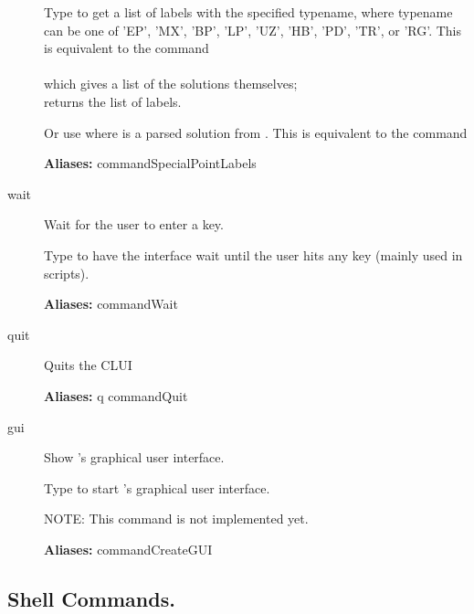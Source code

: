 \documentclass[12pt]{report}
\begin{document}
\begin{description}
    Type  to get a list of labels with the specified
    typename, where typename can be one of
    'EP', 'MX', 'BP', 'LP', 'UZ', 'HB', 'PD', 'TR', or 'RG'.
    This is equivalent to the command\\
    \\
    which gives a list of the solutions themselves;
    \\
    returns the list of labels.

    Or use  where  is a parsed
    solution from .
    This is equivalent to the command\\

\textbf{Aliases:} commandSpecialPointLabels

\item[wait]
Wait for the user to enter a key.

    Type  to have the \AUTO interface wait
    until the user hits any key (mainly used in scripts).

\textbf{Aliases:} commandWait

\item[quit]
Quits the \AUTO CLUI

\textbf{Aliases:} q commandQuit

\item[gui]
Show \AUTO's graphical user interface.

    Type  to start \AUTO's graphical user interface.
    
    NOTE: This command is not implemented yet.
    
\textbf{Aliases:} commandCreateGUI

\end{description}

\subsection{Shell Commands.} \label{sec:clui_ref_shell}
\end{document}
